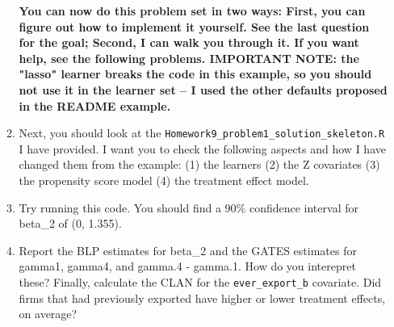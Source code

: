 \documentclass[11pt, a4paper]{article}
\begin{document}
\begin{enumerate}
\begin{enumerate}
    \textbf{You can now do this problem set in two ways:  First, you can figure out how to implement it yourself. See the last question for the goal; Second, I can walk you through it. If you want help, see the following problems. IMPORTANT NOTE: the "lasso" learner breaks the code in this example, so you should not use it in the learner set -- I used the other defaults proposed in the README example.} 
    \item Next, you should look at the \texttt{Homework9\_problem1\_solution\_skeleton.R} I have provided. I want you to check the following aspects and how I have changed them from the example: (1) the learners (2) the Z covariates (3) the propensity score model (4) the treatment effect model.
    \item Try running this code. You should find a 90\% confidence interval for beta\_2 of (0, 1.355). 
    \item Report the BLP estimates for beta\_2 and the GATES estimates for gamma1, gamma4, and gamma.4 - gamma.1. How do you interepret these? Finally, calculate the CLAN for the \texttt{ever\_export\_b} covariate. Did firms that had previously exported have higher or lower treatment effects, on average?
\end{enumerate}

\end{enumerate}
\end{document}
